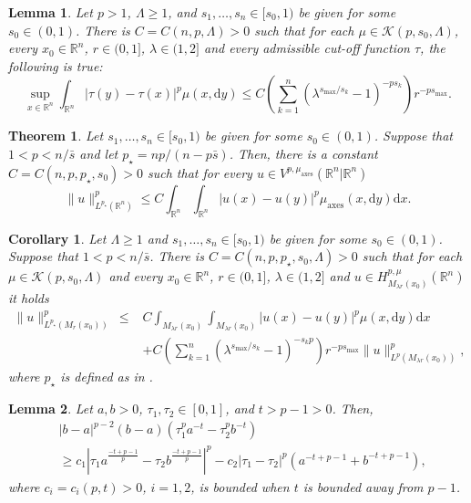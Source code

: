 \documentclass[10pt,a4paper]{amsart}
\newtheorem{lemma}{Lemma}
\newtheorem{theorem}{Theorem}
\newtheorem{corollary}{Corollary}
\newcommand{\R}{\mathbb{R}}
\newcommand{\cK}{\mathcal{K}}
\begin{document}
\begin{lemma}\label{lemma:cutoff}
Let $p> 1$, $\Lambda \ge 1$, and $s_1,\dots,s_n\in[s_0,1)$ be given for some $s_0\in(0,1)$. There is $C = C(n,p,\Lambda) > 0$ such that for each $\mu\in\cK(p,s_0,\Lambda)$, every $x_0\in\R^n$, $r \in (0,1]$, $\lambda \in (1,2]$ and every admissible cut-off function $\tau$, the following is true:
\begin{equation*}
\sup_{x\in\R^n} \int_{\mathbb{R}^n} |\tau(y)-\tau(x)|^p \mu(x,\mathrm{d}y) \leq C \left( \sum_{k=1}^n \left( \lambda^{s_{\max}/s_k}-1 \right)^{-ps_k} \right) r^{-ps_{\max}}.
\end{equation*}
\end{lemma}

\begin{theorem}\label{thm:sobolev}
Let $s_1,\dots,s_n\in[s_0,1)$ be given for some $s_0\in(0,1)$. Suppose that $1 < p < n/\bar{s}$ and let $p_{\star} = np/(n-p\bar{s})$. Then, there is a constant $C = C(n, p, p_{\star}, s_0) > 0$ such that
for every $u \in V^{p,\mu_\mathrm{axes}}(\mathbb{R}^n | \mathbb{R}^n)$
\begin{equation} \label{eq:sobolev}
\|u\|_{L^{p_{\star}}(\mathbb{R}^n)}^p \leq C \int_{\mathbb{R}^n} \int_{\mathbb{R}^n} |u(x)-u(y)|^p \mu_{\mathrm{axes}}(x, \mathrm{d}y) \mathrm{d}x.
\end{equation}
\end{theorem}

\begin{corollary} \label{thm:sobolev_loc}
Let $\Lambda \ge 1$ and $s_1,\dots,s_n\in[s_0,1)$ be given for some $s_0\in(0,1)$. Suppose that $1 < p < n/\bar{s}$. There is $C = C(n,p,p_{\star},s_0,\Lambda) > 0$ such that for each $\mu \in \cK(p,s_0,\Lambda)$ and every $x_0 \in \R^n$, $r \in (0,1]$, $\lambda \in (1,2]$ and $u \in H^{p,\mu}_{{M_{\lambda r}(x_0)}}(\R^n)$ it holds
\begin{equation*}
\begin{split}
\|u\|_{L^{{p_{\star}}}(M_r(x_0))}^p\
\leq& C \int_{M_{\lambda r}(x_0)} \int_{M_{\lambda r}(x_0)} |u(x)-u(y)|^p \mu(x, \mathrm{d}y) \mathrm{d}x \\
&+ C \left( \sum_{k=1}^n \left( \lambda^{s_{\max}/s_k}-1 \right)^{-s_k p} \right) r^{-ps_{\max}} \|u\|_{L^p(M_{\lambda r}(x_0))}^p,
\end{split}
\end{equation*}
where ${p_{\star}}$ is defined as in .
\end{corollary}

\begin{lemma} \label{lem:alg_ineq}
Let $a, b > 0$, $\tau_1, \tau_2 \in [0,1]$, and $t > p-1 > 0$. Then,
\begin{equation*}
\begin{split}
&|b-a|^{p-2}(b-a)(\tau_1^p a^{-t} - \tau_2^p b^{-t}) \\
&\geq c_1 \left| \tau_1 a^{\frac{-t+p-1}{p}} - \tau_2 b^{\frac{-t+p-1}{p}} \right|^p - c_2 |\tau_1-\tau_2|^p \left( a^{-t+p-1} + b^{-t+p-1} \right),
\end{split}
\end{equation*}
where $c_i = c_i(p, t) > 0$, $i=1, 2$, is bounded when $t$ is bounded away from $p-1$.
\end{lemma}
\end{document}
